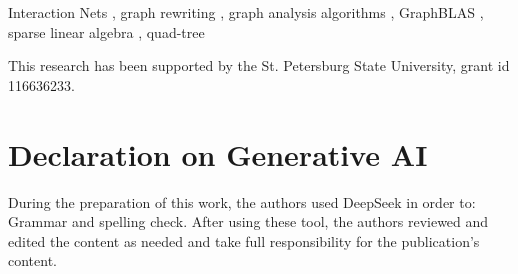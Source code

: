 \documentclass[
]{ceurart}
\begin{document}
\begin{keywords}
  Interaction Nets \sep
  graph rewriting \sep
  graph analysis algorithms \sep
  GraphBLAS \sep
  sparse linear algebra \sep
  quad-tree
\end{keywords}

\maketitle






%

%  
%  

\begin{acknowledgments}
  This research has been supported by the St. Petersburg State University, grant id 116636233.
\end{acknowledgments}

\section*{Declaration on Generative AI}
 
 During the preparation of this work, the authors used DeepSeek in order to: Grammar and spelling check. 
 After using these tool, the authors reviewed and edited the content as needed and take full responsibility for the publication’s content. 
\end{document}
